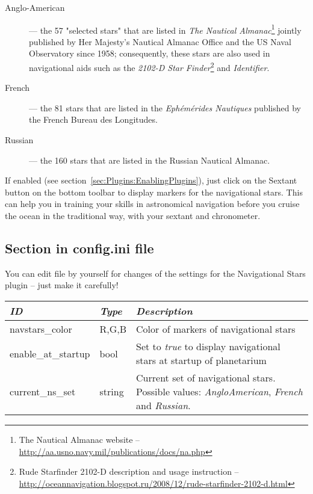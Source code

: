 \begin{description}
	\item[Anglo-American] --- the 57 "selected stars" that are listed in \emph{The Nautical Almanac}\footnote{The Nautical Almanac
		website -- \url{http://aa.usno.navy.mil/publications/docs/na.php}} jointly published by Her Majesty's Nautical Almanac Office and the US Naval Observatory since 1958; consequently, these stars are also used in navigational aids such as the \emph{2102-D Star Finder}\footnote{Rude Starfinder 2102-D
		description and usage instruction --
		\url{http://oceannavigation.blogspot.ru/2008/12/rude-starfinder-2102-d.html}} and \emph{Identifier}. 
	\item[French] --- the 81 stars that are listed in the \emph{Ephémérides Nautiques} published by the French Bureau des Longitudes.
	\item[Russian] --- the 160 stars that are listed in the Russian Nautical Almanac.
\end{description}
If enabled (see section~\ref{sec:Plugins:EnablingPlugins}), just click
on the Sextant button  on
the bottom toolbar to display markers for the navigational stars. This
can help you in training your skills in astronomical navigation before
you cruise the ocean in the traditional way, with your sextant and
chronometer.


\subsection{Section  in config.ini file}

You can edit  file by yourself for changes of the
settings for the Navigational Stars plugin -- just make it carefully!

\noindent%
\begin{tabularx}{\textwidth}{l|l|X}\toprule
\emph{ID}			& \emph{Type} 	& \emph{Description}\\\midrule
navstars\_color 	& R,G,B 		& Color of markers of navigational stars  \\
enable\_at\_startup & bool 		    & Set to \emph{true} to display navigational stars at startup of planetarium  \\
current\_ns\_set	& string		& Current set of navigational stars. Possible values: \emph{AngloAmerican}, \emph{French} and \emph{Russian}. \\
\bottomrule
\end{tabularx}

